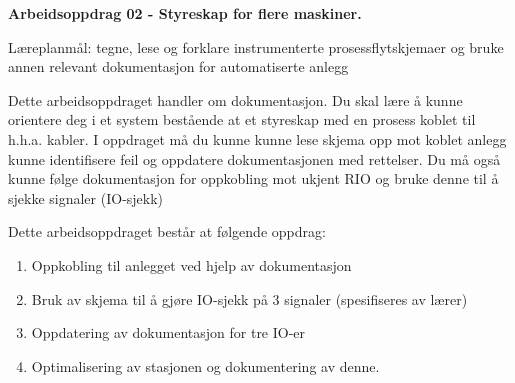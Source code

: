 
\noindent
{\bf Arbeidsoppdrag 02 - Styreskap for flere maskiner.}

\vskip 5pt
Læreplanmål:
tegne, lese og forklare instrumenterte prosessflytskjemaer og bruke annen relevant dokumentasjon for automatiserte anlegg

Dette arbeidsoppdraget handler om dokumentasjon. Du skal lære å kunne orientere deg i et system bestående at et styreskap med en prosess koblet til h.h.a. kabler. I oppdraget må du kunne kunne lese skjema opp mot koblet anlegg kunne identifisere feil og oppdatere dokumentasjonen med rettelser. Du må også kunne følge dokumentasjon for oppkobling mot ukjent RIO og bruke denne til å sjekke signaler (IO-sjekk)

Dette arbeidsoppdraget består at følgende oppdrag:
\begin{enumerate}
	\item Oppkobling til anlegget ved hjelp av dokumentasjon
	\item Bruk av skjema til å gjøre IO-sjekk på 3 signaler (spesifiseres av lærer)
	\item Oppdatering av dokumentasjon for tre IO-er
	\item Optimalisering av stasjonen og dokumentering av denne. 
\end{enumerate}





